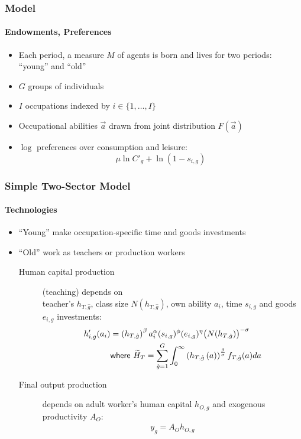 \documentclass[11pt]{beamer}
\begin{document}
	\begin{frame}
		\frametitle{Model}
		\framesubtitle{Endowments, Preferences}
		\begin{itemize}
			\item Each period, a measure $M$ of agents is born and lives for two periods: ``young'' and ``old''
			\item $G$ groups of individuals
            \item $I$ occupations indexed by $i \in \{1,\dots,I\}$
			\item Occupational abilities $\vec{a}$ drawn from joint distribution $F(\vec{a})$
			\item $\log$ preferences over consumption and leisure:
			\begin{displaymath}
				\mu \ln C'_{g} + \ln\left(1-s_{i,g} \right)
			\end{displaymath}
		\end{itemize}
	\end{frame}
	
	\begin{frame}
		\frametitle{Simple Two-Sector Model}
		\framesubtitle{Technologies}
		\begin{itemize}
			\item ``Young'' make occupation-specific time and goods investments
			\item ``Old'' work as \alert{teachers} or \alert{production workers}
			\begin{description}
				\item[Human capital production] (teaching) depends on\\
				teacher's $h_{T,\hat{g}}$, class size $N(h_{T,\hat{g}})$,  own ability $a_i$, time $s_{i,g}$ and goods $e_{i,g}$ investments:
				\begin{align*}
					\label{}
					h'_{i,g}(a_i) & =\left( h_{T,\hat{g}}\right)^\beta a_i^\alpha(s_{i,g})^{\phi} (e_{i,g})^{\eta}\big(N(h_{T,\hat{g}})\big)^{-\sigma}\\
					& \textrm{{\sf where }} \widetilde{H}_T =\sum_{\hat{g}=1}^G \int_0^\infty \left( h_{T,\hat{g}}\left( a \right) \right)^{\frac{\beta}{\sigma}} f_{T,\hat{g}}(a) da
				\end{align*}
				\item[Final output production] depends on adult worker's human capital $h_{O,g}$ and exogenous productivity $A_O$:
				\begin{align*}
					\label{}
					y_g = A_O h_{O,g}
				\end{align*}
			\end{description}
		\end{itemize}
	\end{frame}
	
\end{document}
